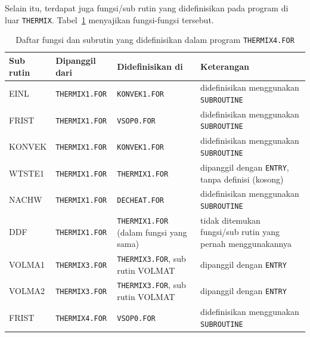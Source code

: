 \documentclass[a4paper,11pt]{report}
\renewcommand{\tablename}{Tabel}
\begin{document}
Selain itu, terdapat juga fungsi/sub rutin yang didefinisikan pada program di luar \texttt{THERMIX}. \tablename~\ref{tab:anomali} menyajikan fungsi-fungsi tersebut.

\begin{table}[h!]
  \caption{Daftar fungsi dan subrutin yang didefinisikan dalam program \texttt{THERMIX4.FOR}}
  \label{tab:anomali}
  \begin{center}
    \begin{tabular}{p{2cm}|p{2.75cm}|p{3cm}|p{4.5cm}} \toprule
    Sub rutin & Dipanggil dari & Didefinisikan di & Keterangan \\ \midrule
    EINL & \texttt{THERMIX1.FOR} & \texttt{KONVEK1.FOR} & didefinisikan menggunakan \texttt{SUBROUTINE} \\
    FRIST & \texttt{THERMIX1.FOR} & \texttt{VSOP0.FOR} & didefinisikan menggunakan \texttt{SUBROUTINE} \\
    KONVEK & \texttt{THERMIX1.FOR} & \texttt{KONVEK1.FOR} & didefinisikan menggunakan \texttt{SUBROUTINE} \\
    WTSTE1 & \texttt{THERMIX1.FOR} & \texttt{THERMIX1.FOR} & dipanggil dengan \texttt{ENTRY}, tanpa definisi (kosong)\\
    NACHW & \texttt{THERMIX1.FOR} & \texttt{DECHEAT.FOR} & didefinisikan menggunakan \texttt{SUBROUTINE} \\
    DDF & \texttt{THERMIX1.FOR} & \texttt{THERMIX1.FOR} (dalam fungsi yang sama) & tidak ditemukan fungsi/sub rutin yang pernah menggunakannya \\
    VOLMA1 & \texttt{THERMIX3.FOR} & \texttt{THERMIX3.FOR}, sub rutin VOLMAT & dipanggil dengan \texttt{ENTRY}\\
    VOLMA2 & \texttt{THERMIX3.FOR} & \texttt{THERMIX3.FOR}, sub rutin VOLMAT & dipanggil dengan \texttt{ENTRY}\\
    FRIST & \texttt{THERMIX4.FOR} & \texttt{VSOP0.FOR} & didefinisikan menggunakan \texttt{SUBROUTINE} \\
      \bottomrule
    \end{tabular}
  \end{center}
\end{table}
\end{document}
